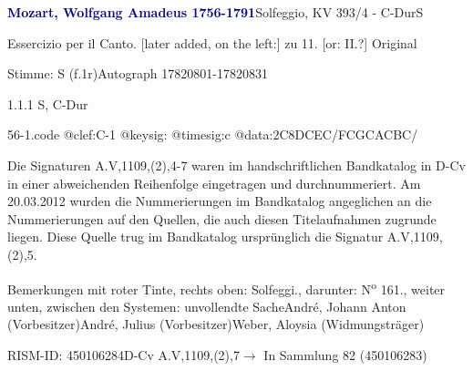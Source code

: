 \documentclass[a4paper, twocolumn, 11pt]{book}
\begin{document}
\par \vspace{16pt} \textcolor{darkblue}{\textbf{Mozart, Wolfgang Amadeus  1756-1791}}\hfillplus{[56]}\newline Solfeggio, KV 393/4 - C-Dur\newline S
\par \begin{itshape} Essercizio per il Canto. [later added, on the left:] zu 11. [or: II.?] Original\end{itshape} 
\par \textcolor{darkblue}{}  Stimme: S  (f.1r)\newline Autograph  17820801-17820831
\par 1.1.1  S, C-Dur  
\begin{filecontents*}{56-1.code}
@clef:C-1
@keysig:
@timesig:c
@data:2C{8DCEC}/{FCGC}{ACBC}/
\end{filecontents*}

\newline %
\par Die Signaturen A.V,1109,(2),4-7 waren im handschriftlichen Bandkatalog in D-Cv in einer abweichenden Reihenfolge eingetragen und durchnummeriert. Am 20.03.2012 wurden die Nummerierungen im Bandkatalog angeglichen an die Nummerierungen auf den Quellen, die auch diesen Titelaufnahmen zugrunde liegen. Diese Quelle trug im Bandkatalog ursprünglich die Signatur A.V,1109,(2),5.
\par Bemerkungen mit roter Tinte, rechts oben: {\textquotedbl}Solfeggi.{\textquotedbl}, darunter: {\textquotedbl}N\textsuperscript{o} 161.{\textquotedbl}, weiter unten, zwischen den Systemen: {\textquotedbl}unvollendte Sache{\textquotedbl}\newline André, Johann Anton  (Vorbesitzer)\newline André, Julius  (Vorbesitzer)\newline Weber, Aloysia  (Widmungsträger)
\par RISM-ID: 450106284\newline D-Cv  A.V,1109,(2),7\newline $\rightarrow$ In Sammlung 82 (450106283)
      
\end{document}
